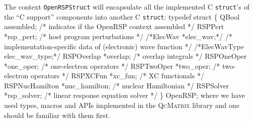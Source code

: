 The \LibName context {\tt{}OpenRSPStruct} will encapsulate all the implemented C
{\tt{}struct}'s of the ``\LibName C support'' components into another C
{\tt{}struct}:
\nwenddocs{}\endmoddef
typedef struct \{
    QBool assembled;               /* indicates if the OpenRSP context assembled */
    RSPPert *rsp_pert;             /* host program perturbations */
    /*ElecWav *elec_wav;*/           /* implementation-specific data of (electronic) wave function */
    /*ElecWavType elec_wav_type;*/
    RSPOverlap *overlap;           /* overlap integrals */
    RSPOneOper *one_oper;          /* one-electron operators */
    RSPTwoOper *two_oper;          /* two-electron operators */
    RSPXCFun *xc_fun;              /* XC functionals */
    RSPNucHamilton *nuc_hamilton;  /* nuclear Hamiltonian */
    RSPSolver *rsp_solver;         /* linear response equation solver */
\} OpenRSP;
\nwendcode{}where we have used types, macros and APIs implemented in the
\textsc{QcMatrix} library and one should be familiar with them first.

